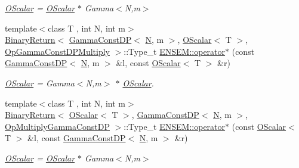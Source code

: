 \begin{DoxyCompactItemize}
\begin{DoxyCompactList}\small\item\em \mbox{\hyperlink{classENSEM_1_1OScalar}{O\+Scalar}} = \mbox{\hyperlink{classENSEM_1_1OScalar}{O\+Scalar}} $\ast$ Gamma$<$\+N,m$>$ \end{DoxyCompactList}\item 
{\footnotesize template$<$class T , int N, int m$>$ }\\\mbox{\hyperlink{structENSEM_1_1BinaryReturn}{Binary\+Return}}$<$ \mbox{\hyperlink{classENSEM_1_1GammaConstDP}{Gamma\+Const\+DP}}$<$ \mbox{\hyperlink{adat__devel_2lib_2hadron_2operator__name__util_8cc_a7722c8ecbb62d99aee7ce68b1752f337}{N}}, m $>$, \mbox{\hyperlink{classENSEM_1_1OScalar}{O\+Scalar}}$<$ T $>$, \mbox{\hyperlink{structENSEM_1_1OpGammaConstDPMultiply}{Op\+Gamma\+Const\+D\+P\+Multiply}} $>$\+::Type\+\_\+t \mbox{\hyperlink{group__obsscalar_gadcaef62da25fe9015ccfbdc330caee50}{E\+N\+S\+E\+M\+::operator$\ast$}} (const \mbox{\hyperlink{classENSEM_1_1GammaConstDP}{Gamma\+Const\+DP}}$<$ \mbox{\hyperlink{adat__devel_2lib_2hadron_2operator__name__util_8cc_a7722c8ecbb62d99aee7ce68b1752f337}{N}}, m $>$ \&l, const \mbox{\hyperlink{classENSEM_1_1OScalar}{O\+Scalar}}$<$ T $>$ \&r)
\begin{DoxyCompactList}\small\item\em \mbox{\hyperlink{classENSEM_1_1OScalar}{O\+Scalar}} = Gamma$<$\+N,m$>$ $\ast$ \mbox{\hyperlink{classENSEM_1_1OScalar}{O\+Scalar}}. \end{DoxyCompactList}\item 
{\footnotesize template$<$class T , int N, int m$>$ }\\\mbox{\hyperlink{structENSEM_1_1BinaryReturn}{Binary\+Return}}$<$ \mbox{\hyperlink{classENSEM_1_1OScalar}{O\+Scalar}}$<$ T $>$, \mbox{\hyperlink{classENSEM_1_1GammaConstDP}{Gamma\+Const\+DP}}$<$ \mbox{\hyperlink{adat__devel_2lib_2hadron_2operator__name__util_8cc_a7722c8ecbb62d99aee7ce68b1752f337}{N}}, m $>$, \mbox{\hyperlink{structENSEM_1_1OpMultiplyGammaConstDP}{Op\+Multiply\+Gamma\+Const\+DP}} $>$\+::Type\+\_\+t \mbox{\hyperlink{group__obsscalar_ga3a908302b6f4903874da2282ce03fdf7}{E\+N\+S\+E\+M\+::operator$\ast$}} (const \mbox{\hyperlink{classENSEM_1_1OScalar}{O\+Scalar}}$<$ T $>$ \&l, const \mbox{\hyperlink{classENSEM_1_1GammaConstDP}{Gamma\+Const\+DP}}$<$ \mbox{\hyperlink{adat__devel_2lib_2hadron_2operator__name__util_8cc_a7722c8ecbb62d99aee7ce68b1752f337}{N}}, m $>$ \&r)
\begin{DoxyCompactList}\small\item\em \mbox{\hyperlink{classENSEM_1_1OScalar}{O\+Scalar}} = \mbox{\hyperlink{classENSEM_1_1OScalar}{O\+Scalar}} $\ast$ Gamma$<$\+N,m$>$ \end{DoxyCompactList}\item 

\end{DoxyCompactItemize}
